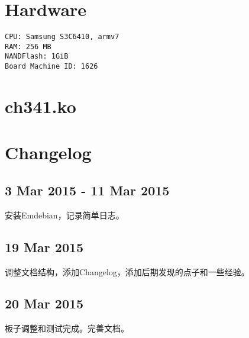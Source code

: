 \documentclass[11pt,a4paper]{article}
\begin{document}
\begin{CJK}{UTF8}{gbsn}
\section{Hardware}
\begin{verbatim}
CPU: Samsung S3C6410, armv7
RAM: 256 MB
NANDFlash: 1GiB
Board Machine ID: 1626
\end{verbatim}

\section{ch341.ko}


\section{Changelog}
\subsection{3 Mar 2015 - 11 Mar 2015}
安装Emdebian，记录简单日志。
\subsection{19 Mar 2015}
调整文档结构，添加Changelog，添加后期发现的点子和一些经验。
\subsection{20 Mar 2015}
板子调整和测试完成。完善文档。

\end{CJK}
\end{document}
